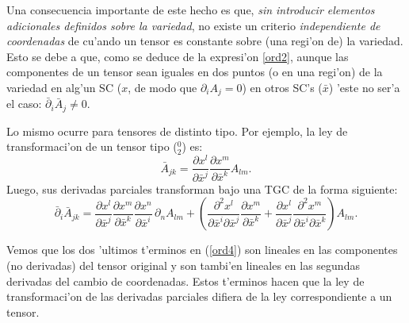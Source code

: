 Una consecuencia importante de este hecho es que, \textit{sin introducir elementos adicionales definidos sobre la variedad}, no existe un criterio \textit{independiente de coordenadas} de cu'ando un tensor es constante sobre (una regi'on de) la variedad. Esto se debe a que, como se deduce de la expresi'on \eqref{ord2}, aunque las componentes de un tensor sean iguales en dos puntos (o en una regi'on) de la variedad en alg'un SC ($x$, de modo que $\partial_iA_j=0$) en otros SC's ($\bar{x}$) 'este no ser'a el caso: $\bar{\partial}_i\bar{A}_j\neq 0$.
 
Lo mismo ocurre para tensores de distinto tipo. Por ejemplo, la ley de transformaci'on de un tensor tipo ($_2^0$) es:
\begin{equation}
\bar{A}_{jk}=\frac{\partial x^l}{\partial\bar{x}^j} \frac{\partial x^m}{\partial\bar{x}^k}A_{lm}. \label{ord3}
\end{equation}
Luego, sus derivadas parciales transforman bajo una TGC de la forma siguiente:
\begin{equation}
\bar{\partial}_i\bar{A}_{jk}=\frac{\partial x^l}{\partial\bar{x}^j} 
\frac{\partial x^m}{\partial\bar{x}^k} \frac{\partial x^n}{\partial \bar{x}^i}\,\partial_nA_{lm}+\left(
\frac{\partial^2 x^l}{\partial\bar{x}^i\partial\bar{x}^j} \frac{\partial x^m}{\partial\bar{x}^k} 
+\frac{\partial x^l}{\partial\bar{x}^j}\frac{\partial^2 x^m}{\partial\bar{x}^i\partial\bar{x}^k}\right) A_{lm}. \label{ord4}
\end{equation}

Vemos que los dos 'ultimos t'erminos en (\ref{ord4}) son lineales en las
componentes (no derivadas) del tensor original y son tambi'en lineales en las segundas derivadas del cambio de coordenadas. Estos t'erminos hacen que la ley de transformaci'on de las derivadas parciales difiera de la ley correspondiente a un tensor.

